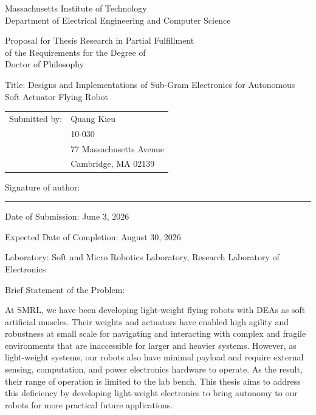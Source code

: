 \documentclass{article}
\author{
    \myname\\
    Massachusetts Institute of Technology\\
    \texttt{\myemail}
}
\date{\mydate}
\title{\mytitle}
\newcommand{\myname}{Quang Kieu}
\newcommand{\myaddress}{
    & 10-030 \\
    & 77 Massachusetts Avenue \\
    & Cambridge, MA 02139
}
\newcommand{\mydate}{June 3, 2026}
\newcommand{\mycompletion}{August 30, 2026}
\newcommand{\mytitle}{Designs and Implementations of Sub-Gram Electronics for Autonomous Soft Actuator Flying Robot}
\begin{document}
\begingroup
{}\large\selectfont


\begin{center}
Massachusetts Institute of Technology \\
Department of Electrical Engineering and Computer Science
\end{center}

\begin{center}
Proposal for Thesis Research in Partial Fulfillment \\
of the Requirements for the Degree of \\
Doctor of Philosophy
\end{center}

\vspace{1em}
\noindent Title: \mytitle

\vspace{1em}
\noindent\begin{tabular}{@{}ll}
Submitted by: & \myname \\
              \myaddress
\end{tabular}

\vspace{1em}
\noindent Signature of author: \rule{5cm}{0.1pt}

\vspace{1em}
\noindent Date of Submission: \mydate

\vspace{1em}
\noindent Expected Date of Completion: \mycompletion

\vspace{1em}
\noindent Laboratory: Soft and Micro Robotics Laboratory, Research Laboratory of Electronics

\vspace{1em}
\noindent Brief Statement of the Problem:

\vspace{1em}
\begin{minipage}{\dimexpr\textwidth-1cm}

\noindent At SMRL, we have been developing light-weight flying robots with DEAs as soft artificial muscles. Their weights and actuators have enabled high agility and robustness at small scale for navigating and interacting with complex and fragile environments that are inaccessible for larger and heavier systems. However, as light-weight systems, our robots also have minimal payload and require external sensing, computation, and power electronics hardware to operate. As the result, their range of operation is limited to the lab bench. This thesis aims to address this deficiency by developing light-weight electronics to bring autonomy to our robots for more practical future applications.


\end{minipage}
\end{document}

